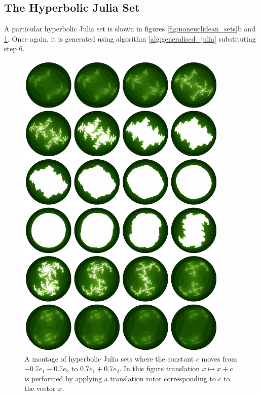\begin{enumarate}
\subsection{The Hyperbolic Julia Set}

A particular hyperbolic Julia set is shown in figures \ref{fig:noneuclidean_sets}b
and \ref{fig:julia_montage}.  Once again, it is generated using algorithm
\ref{alg:generalised_julia} substituting step 6.

\begin{figure}[p]
\centering
\includegraphics[width=0.9\textwidth]{julia_montage}
\caption{\label{fig:julia_montage} 
  A montage of hyperbolic Julia sets where the constant $c$ moves from $-0.7e_1 - 0.7e_2$
  to $0.7e_1 + 0.7e_2$. 
  In this figure translation $x \mapsto x + c$ is performed by applying a
  translation rotor corresponding to $c$ to the vector $x$.
}
\end{figure}


\end{enumarate}
